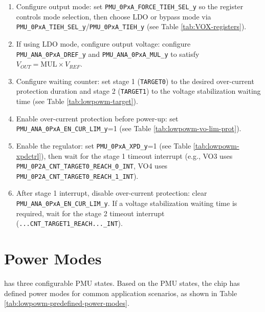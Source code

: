\documentclass[main\_\_EN.tex]{subfiles}
\begin{document}
\begin{itemize}
    \begin{enumerate}
    \item Configure output mode: set \texttt{PMU\_0PxA\_FORCE\_TIEH\_SEL\_y} so the register controls mode selection, then choose LDO or bypass mode via \texttt{PMU\_0PxA\_TIEH\_SEL\_y}/\texttt{PMU\_0PxA\_TIEH\_y} (see Table \ref{tab:VOX-registers}).
    \item If using LDO mode, configure output voltage: configure \texttt{PMU\_ANA\_0PxA\_DREF\_y} and \texttt{PMU\_ANA\_0PxA\_MUL\_y} to satisfy \(V_{OUT}=\mathrm{MUL}\times V_{REF}\).
    \item Configure waiting counter: set stage 1 (\texttt{TARGET0}) to the desired over-current protection duration and stage 2 (\texttt{TARGET1}) to the voltage stabilization waiting time (see Table \ref{tab:lowpowm-target}).
    \item Enable over-current protection before power-up: set \texttt{PMU\_ANA\_0PxA\_EN\_CUR\_LIM\_y}=1 (see Table \ref{tab:lowpowm-vo-lim-prot}).
    \item Enable the regulator: set \texttt{PMU\_0PxA\_XPD\_y}=1 (see Table \ref{tab:lowpowm-xpdctrl}), then wait for the stage 1 timeout interrupt (e.g., VO3 uses \texttt{PMU\_0P2A\_CNT\_TARGET0\_REACH\_0\_INT}, VO4 uses \texttt{PMU\_0P2A\_CNT\_TARGET0\_REACH\_1\_INT}).
    \item After stage 1 interrupt, disable over-current protection: clear \texttt{PMU\_ANA\_0PxA\_EN\_CUR\_LIM\_y}. If a voltage stabilization waiting time is required, wait for the stage 2 timeout interrupt (\texttt{...CNT\_TARGET1\_REACH...\_INT}).
    \end{enumerate}

\end{itemize}

\section{Power Modes}

\chipname{} has three configurable PMU states. Based on the PMU states, the chip has defined  power modes for common application scenarios, as shown in Table \ref{tab:lowpowm-predefined-power-modes}.
\end{document}
